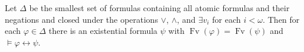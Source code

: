 Let $\Delta$ be the smallest set of formulas containing all atomic formulas and their negations and closed under the operations $\vee$, $\wedge$, and $\exists v_i$ for each $i < \omega$. Then for each $\varphi \in \Delta$ there is an existential formula $\psi$ with $\operatorname{Fv}(\varphi) = \operatorname{Fv}(\psi)$ and $\models \varphi \leftrightarrow \psi$.
